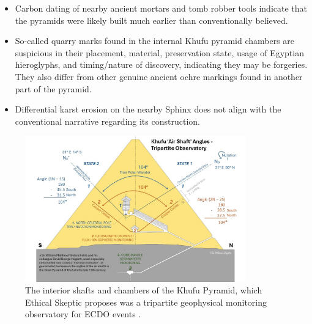 \documentclass[10pt,twocolumn,letterpaper]{article}
\begin{document}
\begin{flushleft}
\begin{itemize}
    \item Carbon dating of nearby ancient mortars and tomb robber tools indicate that the pyramids were likely built much earlier than conventionally believed.
    \item So-called quarry marks found in the internal Khufu pyramid chambers are suspicious in their placement, material, preservation state, usage of Egyptian hieroglyphs, and timing/nature of discovery, indicating they may be forgeries. They also differ from other genuine ancient ochre markings found in another part of the pyramid.
    \item Differential karst erosion on the nearby Sphinx does not align with the conventional narrative regarding its construction.
\end{itemize}
\end{flushleft}

\begin{figure}[b]
\begin{center}
\includegraphics[width=0.85\textwidth]{shafts.jpg}
\end{center}
   \caption{The interior shafts and chambers of the Khufu Pyramid, which Ethical Skeptic proposes was a tripartite geophysical monitoring observatory for ECDO events \cite{28}.}
\label{fig:5}
\end{figure}
\end{document}

